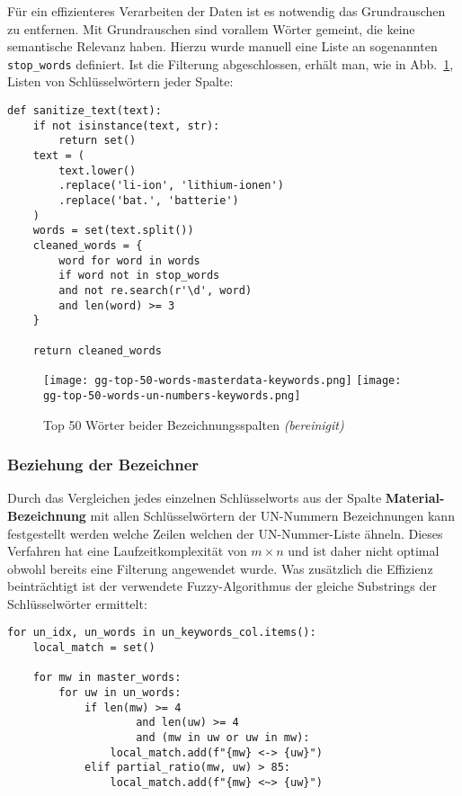 \newpage

Für ein effizienteres Verarbeiten der Daten ist es notwendig das Grundrauschen
zu entfernen. Mit Grundrauschen sind vorallem Wörter gemeint, die keine
semantische Relevanz haben. Hierzu wurde manuell eine Liste an sogenannten
\texttt{stop\_words} definiert. Ist die Filterung abgeschlossen, erhält man,
wie in Abb.~\ref{fig:top-50-filtered}, Listen von Schlüsselwörtern
jeder Spalte:\\

\begin{lstlisting}
def sanitize_text(text):
    if not isinstance(text, str):
        return set()
    text = (
        text.lower()
        .replace('li-ion', 'lithium-ionen')
        .replace('bat.', 'batterie')
    )
    words = set(text.split())
    cleaned_words = {
        word for word in words
        if word not in stop_words
        and not re.search(r'\d', word)
        and len(word) >= 3
    }

    return cleaned_words
\end{lstlisting}

\begin{figure}[htbp]
  \centering
  \texttt{[image: gg-top-50-words-masterdata-keywords.png]}
  \texttt{[image: gg-top-50-words-un-numbers-keywords.png]}
  \caption{Top 50 Wörter beider Bezeichnungsspalten \textit{(bereinigit)}}
  \label{fig:top-50-filtered}
\end{figure}

\newpage

\subsubsection{Beziehung der Bezeichner} 

Durch das Vergleichen jedes einzelnen Schlüsselworts aus der Spalte
\textbf{Material-Bezeichnung} mit allen Schlüsselwörtern der UN-Nummern
Bezeichnungen kann festgestellt werden welche Zeilen welchen der UN-Nummer-Liste
ähneln. Dieses Verfahren hat eine Laufzeitkomplexität von $m \times n$ und 
ist daher nicht optimal obwohl bereits eine Filterung angewendet wurde.
Was zusätzlich die Effizienz beinträchtigt ist der verwendete Fuzzy-Algorithmus
der gleiche Substrings der Schlüsselwörter ermittelt:\\

\begin{lstlisting}
for un_idx, un_words in un_keywords_col.items():
    local_match = set()

    for mw in master_words:
        for uw in un_words:
            if len(mw) >= 4
                    and len(uw) >= 4
                    and (mw in uw or uw in mw):
                local_match.add(f"{mw} <-> {uw}")
            elif partial_ratio(mw, uw) > 85:
                local_match.add(f"{mw} <~> {uw}")

\end{lstlisting}

